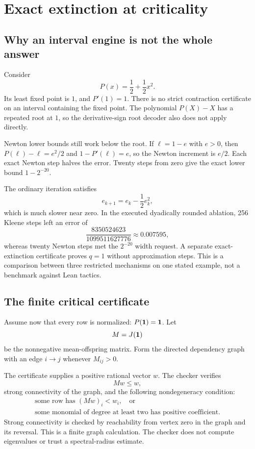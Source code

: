 \section{Exact extinction at criticality}
\label{sec:critical}

\subsection{Why an interval engine is not the whole answer}
Consider
\begin{equation}
 \label{eq:critical}
 P(x)=\frac12+\frac12x^2.
\end{equation}
Its least fixed point is $1$, and $P'(1)=1$. There is no strict contraction certificate on an interval containing the fixed point. The polynomial $P(X)-X$ has a repeated root at $1$, so the derivative-sign root decoder also does not apply directly.

Newton lower bounds still work below the root. If $\ell=1-e$ with $e>0$, then $P(\ell)-\ell=e^2/2$ and $1-P'(\ell)=e$, so the Newton increment is $e/2$. Each exact Newton step halves the error. Twenty steps from zero give the exact lower bound $1-2^{-20}$.

The ordinary iteration satisfies
\[
 e_{k+1}=e_k-\frac12e_k^2,
\]
which is much slower near zero. In the executed dyadically rounded ablation, 256 Kleene steps left an error of
\[
 \frac{8350524623}{1099511627776}\approx0.007595,
\]
whereas twenty Newton steps met the $2^{-20}$ width request. A separate exact-extinction certificate proves $q=1$ without approximation steps. This is a comparison between three restricted mechanisms on one stated example, not a benchmark against Lean tactics.

\subsection{The finite critical certificate}
Assume now that every row is normalized: $P(\mathbf 1)=\mathbf 1$. Let
\[
 M=J(\mathbf 1)
\]
be the nonnegative mean-offspring matrix. Form the directed dependency graph with an edge $i\to j$ whenever $M_{ij}>0$.

The certificate supplies a positive rational vector $w$. The checker verifies
\begin{equation}
 \label{eq:criticalweight}
 Mw\le w,
\end{equation}
strong connectivity of the graph, and the following nondegeneracy condition:
\begin{equation}
 \label{eq:nondegenerate}
 \begin{gathered}
 \text{some row has }(Mw)_i<w_i,\quad\text{or}\\
 \text{some monomial of degree at least two has positive coefficient}.
 \end{gathered}
\end{equation}
Strong connectivity is checked by reachability from vertex zero in the graph and its reversal. This is a finite graph calculation. The checker does not compute eigenvalues or trust a spectral-radius estimate.

